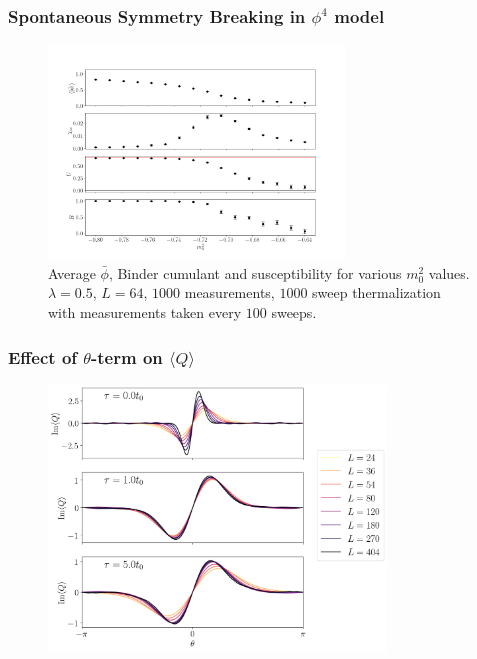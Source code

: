 \documentclass{beamer}
\begin{document}
\begin{frame}
\frametitle{Spontaneous Symmetry Breaking in $\phi^4$ model}
\begin{figure}[h]
  \centering
      \includegraphics[width=0.7\textwidth]{imgs/phi4.png}
      \caption{Average $\bar\phi$, Binder cumulant and susceptibility for various $m_0^2$ values. $\lambda=0.5$, $L=64$, $1000$ measurements, $1000$ sweep thermalization with measurements taken every $100$ sweeps.}
  \label{fig:flow}
\end{figure}
\end{frame}


\begin{frame}
    \frametitle{Effect of $\theta$-term on $\langle Q \rangle$}
\begin{figure}[h]
  \centering
      \includegraphics[width=0.8\textwidth]{imgs/theta.png}

  \label{fig:flow}
\end{figure}
\end{frame}
\end{document}
